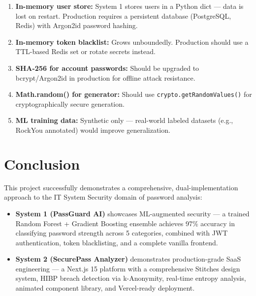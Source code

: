 \documentclass[12pt,a4paper]{article}
\begin{document}
\begin{enumerate}
    \item \textbf{In-memory user store:} System 1 stores users in a Python
    dict — data is lost on restart. Production requires a persistent database
    (PostgreSQL, Redis) with Argon2id password hashing.

    \item \textbf{In-memory token blacklist:} Grows unboundedly. Production
    should use a TTL-based Redis set or rotate secrets instead.

    \item \textbf{SHA-256 for account passwords:} Should be upgraded to
    bcrypt/Argon2id in production for offline attack resistance.

    \item \textbf{Math.random() for generator:} Should use
    \texttt{crypto.getRandomValues()} for cryptographically secure generation.

    \item \textbf{ML training data:} Synthetic only — real-world labeled
    datasets (e.g., RockYou annotated) would improve generalization.
\end{enumerate}

\section{Conclusion}

This project successfully demonstrates a comprehensive, dual-implementation
approach to the IT System Security domain of password analysis:

\begin{itemize}
    \item \textbf{System 1 (PassGuard AI)} showcases ML-augmented security
    — a trained Random Forest + Gradient Boosting ensemble achieves
    97\% accuracy in classifying password strength across 5 categories,
    combined with JWT authentication, token blacklisting, and a complete
    vanilla frontend.

    \item \textbf{System 2 (SecurePass Analyzer)} demonstrates
    production-grade SaaS engineering — a Next.js 15 platform with
    a comprehensive Stitches design system, HIBP breach detection via
    k-Anonymity, real-time entropy analysis, animated component library,
    and Vercel-ready deployment.
\end{itemize}
\end{document}
